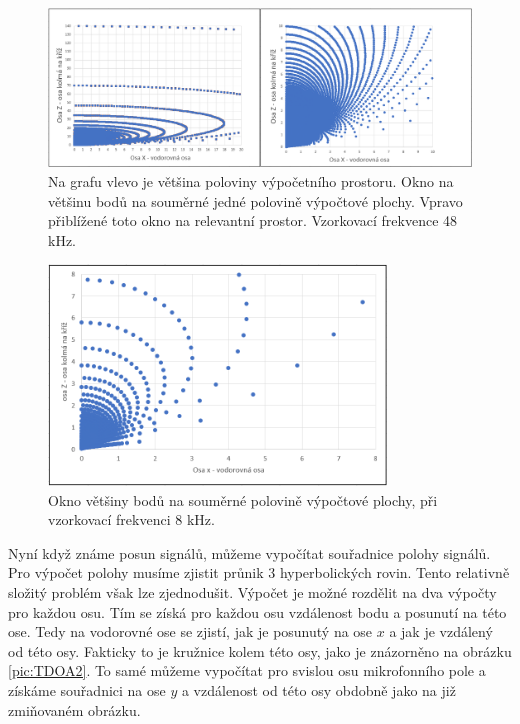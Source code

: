 \begin{figure}[!hbt]
	\centering
	\includegraphics[width=1\textwidth]{obrazky-figures/graf_48khz.png}
	\caption{Na grafu vlevo je většina poloviny výpočetního prostoru. Okno na většinu bodů na souměrné jedné polovině výpočtové plochy. Vpravo přiblížené toto okno na relevantní prostor. Vzorkovací frekvence 48 kHz.}
	\label{pic:graf48}
\end{figure}

\begin{figure}[hbt]
	\centering
	\includegraphics[width=0.8\textwidth]{obrazky-figures/graf_8khz.png}
	\caption{Okno většiny bodů na souměrné polovině výpočtové plochy, při vzorkovací frekvenci 8 kHz.}
	\label{pic:graf8}
\end{figure}

Nyní když známe posun signálů, můžeme vypočítat souřadnice polohy signálů. Pro výpočet polohy musíme zjistit průnik 3 hyperbolických rovin. Tento relativně složitý problém však lze zjednodušit. Výpočet je možné rozdělit na dva výpočty pro každou osu. Tím se získá pro každou osu vzdálenost bodu a posunutí na této ose. Tedy na vodorovné ose se zjistí, jak je posunutý na ose $x$ a jak je vzdálený od této osy. Fakticky to je kružnice kolem této osy, jako je znázorněno na obrázku \ref{pic:TDOA2}. To samé můžeme vypočítat pro svislou osu mikrofonního pole a získáme souřadnici na ose $y$ a vzdálenost od této osy obdobně jako na již zmiňovaném obrázku.

